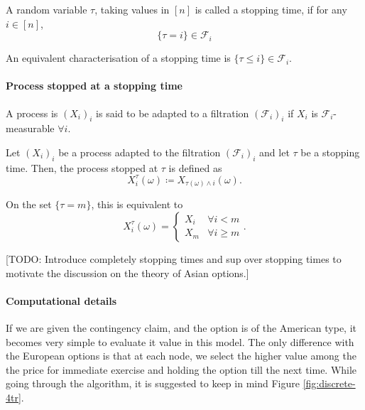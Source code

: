 \begin{dfn}
	A random variable $ \tau $, taking values in $ [n] $ is called a stopping time, if for any $ i \in [n] $,
	\begin{equation*}
		\{ \tau = i \} \in \mathcal{F}_i
	\end{equation*}
\end{dfn}

An equivalent characterisation of a stopping time is $ \{ \tau \le i \} \in \mathcal{F}_i $.

\paragraph{Process stopped at a stopping time}
A process is $ (X_i)_i $ is said to be adapted to a filtration $ (\mathcal{F}_i)_i $ if $ X_i $ is $ \mathcal{F}_i $-measurable $ \forall i $.

Let $ (X_i)_i $ be a process adapted to the filtration $ (\mathcal{F}_i)_i $ and let $ \tau $ be a stopping time. Then, the process stopped at $ \tau $ is defined as
\begin{equation*}
	X_{ i }^{ \tau }( \omega )  \coloneqq  X_{ \tau( \omega ) \wedge i }( \omega ) .
\end{equation*}

On the set $ \{ \tau = m \} $, this is equivalent to
\begin{equation*}
	X_{ i }^{ \tau }( \omega ) = \begin{cases}
		X_i  &  \forall i < m  \\
		X_m  &  \forall i \ge m
	\end{cases} .
\end{equation*}

[TODO: Introduce completely stopping times and sup over stopping times to motivate the discussion on the theory of Asian options.]


\paragraph{Computational details}
If we are given the contingency claim, and the option is of the American type, it becomes very simple to evaluate it value in this model. The only difference with the European options is that at each node, we select the higher value among the the price for immediate exercise and holding the option till the next time. While going through the algorithm, it is suggested to keep in mind Figure \ref{fig:discrete-4tr}.

